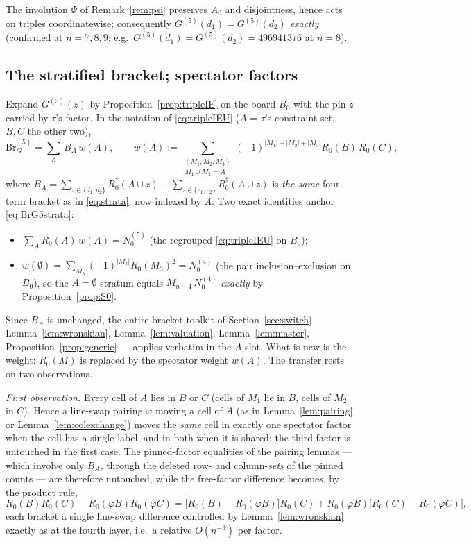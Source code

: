 \begin{remark}
The involution $\Psi$ of Remark~\ref{rem:psi} preserves $A_0$ and
disjointness, hence acts on triples coordinatewise; consequently
$G^{(5)}(d_1)=G^{(5)}(d_2)$ \emph{exactly} (confirmed at $n=7,8,9$:
e.g.\ $G^{(5)}(d_1)=G^{(5)}(d_2)=496941376$ at $n=8$).
\end{remark}

\subsection{The stratified bracket; spectator factors}

Expand $G^{(5)}(z)$ by Proposition~\ref{prop:tripleIE} on the board
$B_0$ with the pin $z$ carried by $\tau$'s factor.  In the notation of
\eqref{eq:tripleIEU} ($A$ = $\tau$'s constraint set, $B,C$ the other
two),
\begin{equation}\label{eq:BrG5strata}
\mathrm{Br}^{(5)}_G=\sum_{A}\,B_A\,w(A),
\qquad
w(A):=\!\!\sum_{\substack{(M_1,M_2,M_3)\\ M_1\cup M_2=A}}\!\!
(-1)^{|M_1|+|M_2|+|M_3|}R_0(B)\,R_0(C),
\end{equation}
where $B_A=\sum_{z\in\{d_1,d_2\}}R_0^\dagger(A\cup z)
-\sum_{z\in\{e_1,e_2\}}R_0^\dagger(A\cup z)$ is \emph{the same}
four-term bracket as in \eqref{eq:strata}, now indexed by $A$.  Two
exact identities anchor \eqref{eq:BrG5strata}:
\begin{itemize}[leftmargin=2em]
\item[(i)] $\sum_A R_0(A)\,w(A)=N^{(5)}_0$ (the regrouped
\eqref{eq:tripleIEU} on $B_0$);
\item[(ii)] $w(\emptyset)=\sum_{M_3}(-1)^{|M_3|}R_0(M_3)^2=N^{(4)}_0$
(the pair inclusion--exclusion on $B_0$), so the $A=\emptyset$ stratum
equals $M_{n-4}\,N^{(4)}_0$ \emph{exactly} by
Proposition~\ref{prop:S0}.
\end{itemize}
Since $B_A$ is unchanged, the entire bracket toolkit of
Section~\ref{sec:switch} --- Lemma~\ref{lem:wronskian},
Lemma~\ref{lem:valuation}, Lemma~\ref{lem:master},
Proposition~\ref{prop:generic} --- applies verbatim in the $A$-slot.
What is new is the weight: $R_0(M)$ is replaced by the spectator weight
$w(A)$.  The transfer rests on two observations.

\emph{First observation.}  Every cell of $A$ lies in $B$ or $C$
(cells of $M_1$ lie in $B$, cells of $M_2$ in $C$).  Hence a line-swap
pairing $\varphi$ moving a cell of $A$ (as in Lemma~\ref{lem:pairing}
or Lemma~\ref{lem:colexchange}) moves the \emph{same} cell in exactly
one spectator factor when the cell has a single label, and in both when
it is shared; the third factor is untouched in the first case.  The
pinned-factor equalities of the pairing lemmas --- which involve only
$B_A$, through the deleted row- and column-\emph{sets} of the pinned
counts --- are therefore untouched, while the free-factor difference
becomes, by the product rule,
\[
R_0(B)R_0(C)-R_0(\varphi B)R_0(\varphi C)
=\bigl[R_0(B)-R_0(\varphi B)\bigr]R_0(C)
+R_0(\varphi B)\bigl[R_0(C)-R_0(\varphi C)\bigr],
\]
each bracket a single line-swap difference controlled by
Lemma~\ref{lem:wronskian} exactly as at the fourth layer, i.e.\ a
relative $O(n^{-3})$ per factor.

